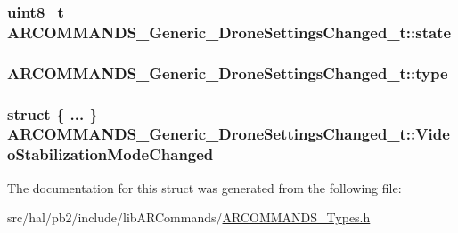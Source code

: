 \subsubsection[{\texorpdfstring{state}{state}}]{\setlength{\rightskip}{0pt plus 5cm}uint8\+\_\+t A\+R\+C\+O\+M\+M\+A\+N\+D\+S\+\_\+\+Generic\+\_\+\+Drone\+Settings\+Changed\+\_\+t\+::state}\hypertarget{struct_a_r_c_o_m_m_a_n_d_s___generic___drone_settings_changed__t_aec9fd2edfa8eece5685b39e6b6a7fe55}{}\label{struct_a_r_c_o_m_m_a_n_d_s___generic___drone_settings_changed__t_aec9fd2edfa8eece5685b39e6b6a7fe55}
\subsubsection[{\texorpdfstring{type}{type}}]{ A\+R\+C\+O\+M\+M\+A\+N\+D\+S\+\_\+\+Generic\+\_\+\+Drone\+Settings\+Changed\+\_\+t\+::type}\hypertarget{struct_a_r_c_o_m_m_a_n_d_s___generic___drone_settings_changed__t_af5fd5f5231996600fbddedd333b714af}{}\label{struct_a_r_c_o_m_m_a_n_d_s___generic___drone_settings_changed__t_af5fd5f5231996600fbddedd333b714af}
\subsubsection[{\texorpdfstring{Video\+Stabilization\+Mode\+Changed}{VideoStabilizationModeChanged}}]{\setlength{\rightskip}{0pt plus 5cm}struct \{ ... \}   A\+R\+C\+O\+M\+M\+A\+N\+D\+S\+\_\+\+Generic\+\_\+\+Drone\+Settings\+Changed\+\_\+t\+::\+Video\+Stabilization\+Mode\+Changed}\hypertarget{struct_a_r_c_o_m_m_a_n_d_s___generic___drone_settings_changed__t_a323ea0123265c7c85cd8d62880a50637}{}\label{struct_a_r_c_o_m_m_a_n_d_s___generic___drone_settings_changed__t_a323ea0123265c7c85cd8d62880a50637}


The documentation for this struct was generated from the following file\+:\begin{DoxyCompactItemize}
\item 
src/hal/pb2/include/lib\+A\+R\+Commands/\hyperlink{_a_r_c_o_m_m_a_n_d_s___types_8h}{A\+R\+C\+O\+M\+M\+A\+N\+D\+S\+\_\+\+Types.\+h}\end{DoxyCompactItemize}
